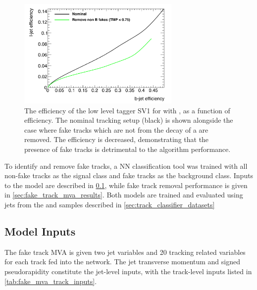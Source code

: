 \begin{figure}[!htbp]
    \centering
    \includegraphics[width=0.7\textwidth]{chapters/4.track_classifier/figs/sv1_perf_nofake.pdf}
    \caption{
      The \ljet efficiency of the low level tagger SV1 for \Zprimejets with \Zprimept, as a function of \bjet efficiency.
      The nominal tracking setup (black) is shown alongside the case where fake tracks which are not from the decay of a \bhadron are removed.
      The \ljet efficiency is decreased, demonstrating that the presence of fake tracks is detrimental to the algorithm performance.
    }
    \label{fig:sv1_perf_nofake}
\end{figure}

To identify and remove fake tracks, a NN classification tool was trained with all non-fake tracks as the signal class and fake tracks as the background class.
Inputs to the model are described in \cref{sec:fake_mva_model_inputs}, while fake track removal performance is given in \cref{sec:fake_track_mva_results}.
Both models are trained and evaluated using jets from the \ttbar and \Zprime samples described in \cref{sec:track_classifier_datasets}


\subsection{Model Inputs}\label{sec:fake_mva_model_inputs}


The fake track MVA is given two jet variables and 20 tracking related variables for each track fed into the network.
The jet transverse momentum and signed pseudorapidity constitute the jet-level inputs, with the track-level inputs listed in \cref{tab:fake_mva_track_inputs}.


